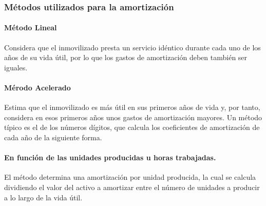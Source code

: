 \subsubsection{Métodos utilizados para la amortización}
\paragraph{Método Lineal}
Considera que el inmovilizado presta un servicio idéntico durante cada uno de los años de su vida útil, por lo que los gastos de amortización deben también ser iguales.

\paragraph{Mérodo Acelerado}
Estima que el inmovilizado es más útil en sus primeros años de vida y, por tanto, considera en esos primeros años unos gastos de amortización mayores. Un método típico es el de los números dígitos, que calcula los coeficientes de amortización de cada año de la siguiente forma.

\paragraph{En función de las unidades producidas u horas trabajadas.}
El método determina una amortización por unidad producida, la cual se calcula dividiendo el valor del activo a amortizar entre el número de unidades a producir a lo largo de la vida útil.